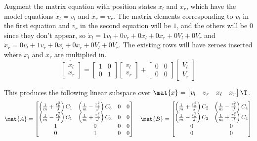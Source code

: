 Augment the matrix equation with position states $x_l$ and $x_r$, which have the
model equations $\dot{x}_l = v_l$ and $\dot{x}_r = v_r$. The matrix elements
corresponding to $v_l$ in the first equation and $v_r$ in the second equation
will be $1$, and the others will be $0$ since they don't appear, so
$\dot{x}_l = 1v_l + 0v_r + 0x_l + 0x_r + 0V_l + 0V_r$ and
$\dot{x}_r = 0v_l + 1v_r + 0x_l + 0x_r + 0V_l + 0V_r$. The existing rows will
have zeroes inserted where $x_l$ and $x_r$ are multiplied in.
\begin{equation*}
  \dot{\begin{bmatrix}
    x_l \\
    x_r
  \end{bmatrix}} =
  \begin{bmatrix}
    1 & 0 \\
    0 & 1
  \end{bmatrix}
  \begin{bmatrix}
    v_l \\
    v_r
  \end{bmatrix} +
  \begin{bmatrix}
    0 & 0 \\
    0 & 0
  \end{bmatrix}
  \begin{bmatrix}
    V_l \\
    V_r
  \end{bmatrix}
\end{equation*}

This produces the following linear subspace over
$\mat{x} = \begin{bmatrix}v_l & v_r & x_l & x_r\end{bmatrix}\T$.
\begin{equation}
  \mat{A} =
  \begin{bmatrix}
    \left(\frac{1}{m} + \frac{r_b^2}{J}\right) C_1 &
      \left(\frac{1}{m} - \frac{r_b^2}{J}\right) C_3 & 0 & 0 \\
    \left(\frac{1}{m} - \frac{r_b^2}{J}\right) C_1 &
      \left(\frac{1}{m} + \frac{r_b^2}{J}\right) C_3 & 0 & 0 \\
    1 & 0 & 0 & 0 \\
    0 & 1 & 0 & 0
  \end{bmatrix}
  \quad
  \mat{B} =
  \begin{bmatrix}
    \left(\frac{1}{m} + \frac{r_b^2}{J}\right) C_2 &
      \left(\frac{1}{m} - \frac{r_b^2}{J}\right) C_4 \\
    \left(\frac{1}{m} - \frac{r_b^2}{J}\right) C_2 &
      \left(\frac{1}{m} + \frac{r_b^2}{J}\right) C_4 \\
    0 & 0 \\
    0 & 0
  \end{bmatrix}
  \label{eq:diff_drive_linear_subspace}
\end{equation}

